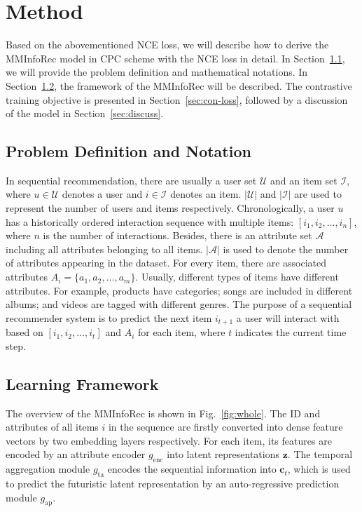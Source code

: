 \documentclass[conference]{IEEEtran}
\begin{document}
\section{Method}
\label{sec:method}
Based on the abovementioned NCE loss, we will describe how to derive the MMInfoRec model in CPC scheme with the NCE loss in detail. In Section~\ref{sec:def}, we will provide the problem definition and mathematical notations. In Section~\ref{sec:frame}, the framework of the MMInfoRec will be described. The contrastive training objective is presented in Section~\ref{sec:con-loss}, followed by a discussion of the model in Section~\ref{sec:discuss}.

\subsection{Problem Definition and Notation}
\label{sec:def}
In sequential recommendation, there are usually a user set $\mathcal{U}$ and an item set $\mathcal{I}$, where $u\in \mathcal{U}$ denotes a user and $i\in \mathcal{I}$ denotes an item. $| \mathcal{U}|$ and $| \mathcal{I}|$ are used to represent the number of users and items respectively. Chronologically, a user $u$ has a historically ordered interaction sequence with multiple items: $\left[i_1,i_2,\ldots,i_n \right]$, where $n$ is the number of interactions. Besides, there is an attribute set $\mathcal{A}$ including all attributes belonging to all items. $| \mathcal{A}|$ is used to denote the number of attributes appearing in the dataset. For every item, there are associated attributes $A_i=\{a_1,a_2,\ldots,a_m\}$. Usually, different types of items have different attributes. For example, products have categories; songs are included in different albums; and videos are tagged with different genres. The purpose of a sequential recommender system is to predict the next item $i_{t+1}$ a user will interact with based on $\left[i_1,i_2,\ldots,i_t \right]$ and $A_i$ for each item, where $t$ indicates the current time step.

\subsection{Learning Framework}
\label{sec:frame}
The overview of the MMInfoRec is shown in Fig.~\ref{fig:whole}. The ID and attributes of all items $i$ in the sequence are firstly converted into dense feature vectors by two embedding layers respectively. For each item, its features are encoded by an attribute encoder $g_\text{enc}$ into latent representations $\mathbf{z}$. The temporal aggregation module $g_\text{ta}$ encodes the sequential information into $\mathbf{c}_t$, which is used to predict the futuristic latent representation by an auto-regressive prediction module $g_\text{ap}$.
\end{document}
